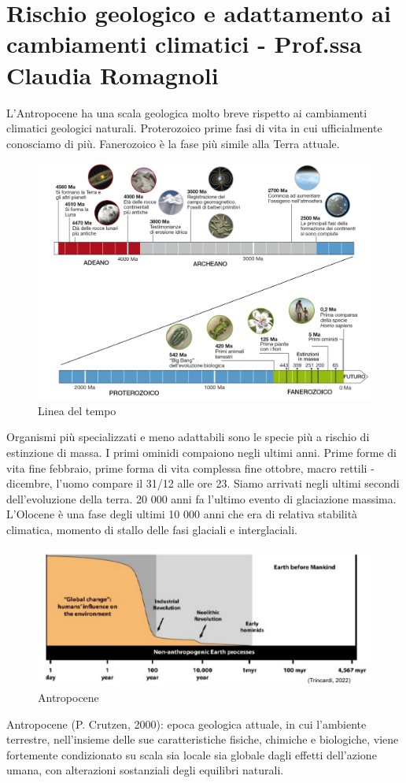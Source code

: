 \chapter{Rischio geologico e adattamento ai cambiamenti climatici - Prof.ssa Claudia Romagnoli}
L'Antropocene ha una scala geologica molto breve rispetto ai cambiamenti climatici geologici naturali. Proterozoico prime fasi di vita in cui ufficialmente conosciamo di più. Fanerozoico è la fase più simile alla Terra attuale.
\begin{figure}[htpb]
    \centering
    \includegraphics[width=0.5\linewidth]{uploads/scala.png}
    \caption{Linea del tempo}
    \label{fig:linea del tempo}
\end{figure}
Organismi più specializzati e meno adattabili sono le specie più a rischio di estinzione di massa. I primi ominidi compaiono negli ultimi anni. Prime forme di vita fine febbraio, prime forma di vita complessa fine ottobre, macro rettili - dicembre, l'uomo compare il 31/12 alle ore 23. Siamo arrivati negli ultimi secondi dell'evoluzione della terra. 20 000 anni fa l'ultimo evento di glaciazione massima. L'Olocene è una fase degli ultimi 10 000 anni che era di relativa stabilità climatica, momento di stallo delle fasi glaciali e interglaciali. 
\begin{figure}[htpb]
    \centering
    \includegraphics[width=0.5\linewidth]{uploads/Antropocene.png}
    \caption{Antropocene}
    \label{fig:antropocene}
\end{figure}
Antropocene (P. Crutzen, 2000): epoca geologica attuale, in cui l’ambiente terrestre,
nell’insieme delle sue caratteristiche fisiche, chimiche e biologiche, viene fortemente
condizionato su scala sia locale sia globale dagli effetti dell’azione umana, con
alterazioni sostanziali degli equilibri naturali.
